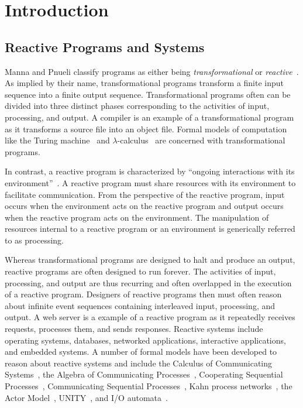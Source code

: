 \chapter{Introduction}
\label{introduction}

\section{Reactive Programs and Systems}

Manna and Pnueli classify programs as either being \emph{transformational} or \emph{reactive}~\cite{manna1992temporal}.
As implied by their name, transformational programs transform a finite input sequence into a finite output sequence.
Transformational programs often can be divided into three distinct phases corresponding to the activities of input, processing, and output.
A compiler is an example of a transformational program as it transforms a source file into an object file.
Formal models of computation like the Turing machine~\cite{turing1936computable} and $\lambda$-calculus~\cite{church1936unsolvable} are concerned with transformational programs.

In contrast, a reactive program is characterized by ``ongoing interactions with its environment''~\cite{manna1992temporal}.
A reactive program must share resources with its environment to facilitate communication.
From the perspective of the reactive program, input occurs when the environment acts on the reactive program and output occurs when the reactive program acts on the environment.
The manipulation of resources internal to a reactive program or an environment is generically referred to as processing.

Whereas transformational programs are designed to halt and produce an output, reactive programs are often designed to run forever.
The activities of input, processing, and output are thus recurring and often overlapped in the execution of a reactive program.
Designers of reactive programs then must often reason about infinite event sequences containing interleaved input, processing, and output.
A web server is a example of a reactive program as it repeatedly receives requests, processes them, and sends responses.
Reactive systems include operating systems, databases, networked applications, interactive applications, and embedded systems.
A number of formal models have been developed to reason about reactive systems and include the Calculus of Communicating Systems~\cite{milner1982calculus}, the Algebra of Communicating Processes~\cite{bergstra1982fixed}, Cooperating Sequential Processes~\cite{dijkstra1965cooperating}, Communicating Sequential Processes~\cite{hoare1978communicating}, Kahn process networks~\cite{kahn1974semantics}, the Actor Model~\cite{hewitt1973universal}\cite{clinger1981foundations}\cite{agha1985actors}, UNITY~\cite{chandy1989parallel}, and I/O automata~\cite{nancy1996distributed}.

